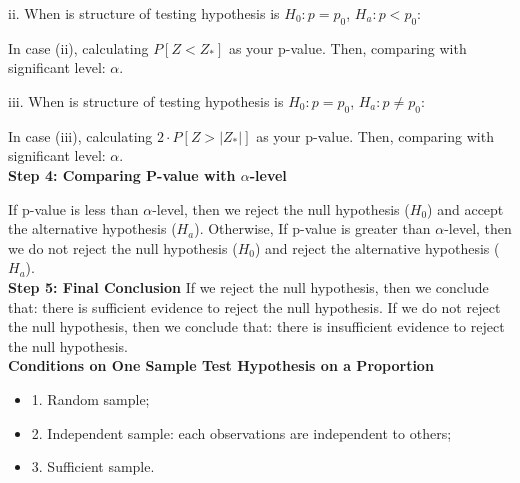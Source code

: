 ii. When is structure of testing hypothesis is $H_0: p = p_0$, $H_a: p < p_0$:


In case (ii), calculating $P[Z < Z_*]$ as your p-value. Then, comparing with significant level: $\alpha$.

iii. When is structure of testing hypothesis is $H_0: p = p_0$, $H_a: p \neq p_0$:


In case (iii), calculating $2\cdot P[Z > |Z_*|]$ as your p-value. Then, comparing with significant level: $\alpha$.\\

\textbf{Step 4: Comparing P-value with $\alpha$-level}

If p-value is less than $\alpha$-level, then we reject the null hypothesis ($H_0$) and accept the alternative hypothesis ($H_a$). Otherwise, If p-value is greater than $\alpha$-level, then we do not reject the null hypothesis ($H_0$) and reject the alternative hypothesis ($H_a$).\\

\textbf{Step 5: Final Conclusion}
If we reject the null hypothesis, then we conclude that: there is sufficient evidence to reject the null hypothesis. If we do not reject the null hypothesis, then we conclude that: there is insufficient evidence to reject the null hypothesis.\\

\textbf{Conditions on One Sample Test Hypothesis on a Proportion}
\begin{itemize}
	\item 1. Random sample;
	\item 2. Independent sample: each observations are independent to others;
	\item 3. Sufficient sample.
\end{itemize}